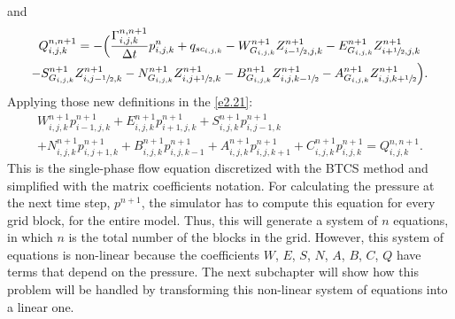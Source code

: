 and
	\begin{multline}\label{coef2}
	Q_{i,j,k}^{n,n+1}=-\Big(\frac{\Gamma_{i,j,k}^{n,n+1}}{\Delta t}p_{i,j,k}^n+ q_{sc_{i,j,k}} - W_{G_{i,j,k}}^{n+1}Z_{i-\sfrac{1}{2},j,k}^{n+1}-E_{G_{i,j,k}}^{n+1}Z_{i+\sfrac{1}{2},j,k}^{n+1}\\-S_{G_{i,j,k}}^{n+1}Z_{i,j-\sfrac{1}{2},k}^{n+1}-N_{G_{i,j,k}}^{n+1}Z_{i,j+\sfrac{1}{2},k}^{n+1}-B_{G_{i,j,k}}^{n+1}Z_{i,j,k-\sfrac{1}{2}}^{n+1}-A_{G_{i,j,k}}^{n+1}Z_{i,j,k+\sfrac{1}{2}}^{n+1}\Big).
	\end{multline}
Applying those new definitions in the \ref{e2.21}:
	\begin{multline}
	\label{matrix}
	W^{n+1}_{i,j,k}p^{n+1}_{i-1,j,k}+E^{n+1}_{i,j,k}p^{n+1}_{i+1,j,k}+S^{n+1}_{i,j,k}p^{n+1}_{i,j-1,k}\\+N^{n+1}_{i,j,k}p^{n+1}_{i,j+1,k}+B^{n+1}_{i,j,k}p^{n+1}_{i,j,k-1}+A^{n+1}_{i,j,k}p^{n+1}_{i,j,k+1}+C^{n+1}_{i,j,k}p^{n+1}_{i,j,k}=Q^{n, n+1}_{i,j,k}.
	\end{multline}
This is the single-phase flow equation discretized with the BTCS method and simplified with the \cite{Ertekin2001} matrix coefficients notation. For calculating the pressure at the next time step, $p^{n + 1}$, the simulator has to compute this equation for every grid block, for the entire model. Thus, this will generate a system of $n$ equations, in which $n$ is the total number of the blocks in the grid. However, this system of equations is non-linear because the coefficients $W$, $E$, $S$, $N$, $A$, $B$, $C$, $Q$ have terms that depend on the pressure. The next subchapter will show how this problem will be handled by transforming this non-linear system of equations into a linear one.

